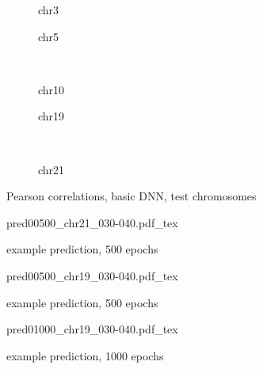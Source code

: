 \begin{figure}[p]
    \begin{subfigure}{0.45\textwidth}
        \scriptsize
        \caption{chr3}
    \end{subfigure} \hfill
    \begin{subfigure}{0.45\textwidth}
        \scriptsize
        \caption{chr5}
    \end{subfigure}\\[5mm]
    \begin{subfigure}{0.45\textwidth}
        \scriptsize
        \caption{chr10}
    \end{subfigure}\hfill
    \begin{subfigure}{0.45\textwidth}
        \scriptsize
        \caption{chr19}
    \end{subfigure}\\[3mm]
    \centering
    \begin{subfigure}{0.45\textwidth}
        \scriptsize
        \caption{chr21}
    \end{subfigure}
    \caption{Pearson correlations, basic DNN, test chromosomes}
    \label{fig:results:basicDNN_pearson}
\end{figure}

\begin{figure}[p]
    \scriptsize
    {pred00500_chr21_030-040.pdf_tex}
    \caption{example prediction, 500 epochs} \label{fig:results:00500_21_030-040}
\end{figure}
\begin{figure}[p]
    \scriptsize
    {pred00500_chr19_030-040.pdf_tex}
    \caption{example prediction, 500 epochs} \label{fig:results:00500_19_030-040}
\end{figure}
\begin{figure}[p]
    \scriptsize
    {pred01000_chr19_030-040.pdf_tex}
    \caption{example prediction, 1000 epochs} \label{fig:results:01000_19_030-040}
\end{figure}

